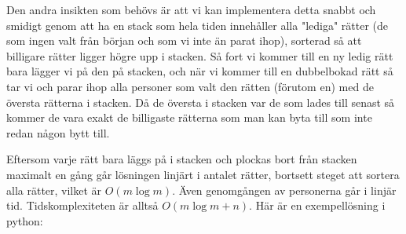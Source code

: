 Den andra insikten som behövs är att vi kan implementera detta snabbt och smidigt genom att ha en stack som hela tiden innehåller alla "lediga" rätter (de som ingen valt från början och som vi inte än parat ihop), sorterad så att billigare rätter ligger högre upp i stacken. Så fort vi kommer till en ny ledig rätt bara lägger vi på den på stacken, och när vi kommer till en dubbelbokad rätt så tar vi och parar ihop alla personer som valt den rätten (förutom en) med de översta rätterna i stacken. Då de översta i stacken var de som lades till senast så kommer de vara exakt de billigaste rätterna som man kan byta till som inte redan någon bytt till.

Eftersom varje rätt bara läggs på i stacken och plockas bort från stacken maximalt en gång går lösningen linjärt i antalet rätter, bortsett steget att sortera alla rätter, vilket är $O(m \log m)$. Även genomgången av personerna går i linjär tid. Tidskomplexiteten är alltså $O(m \log m + n)$. Här är en exempellösning i python:


